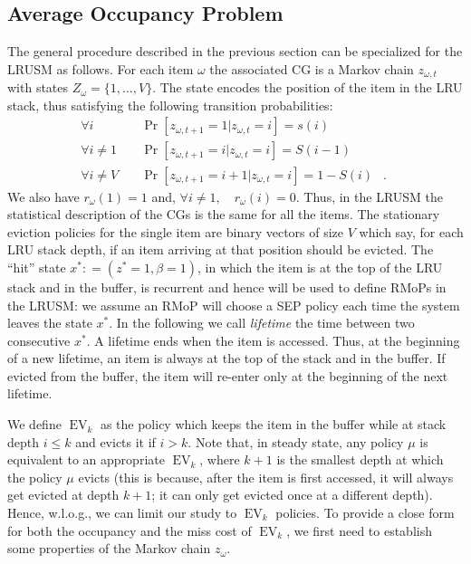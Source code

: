 \documentclass[11pt,a4paper]{article}
\DeclareMathOperator{\Pb}{Pr}
\DeclareMathOperator{\ev}{EV}
\DeclareMathOperator{\mf}{\enspace .}
\newcommand{\deq}{\mathrel{\mathop:}=}
\theoremstyle{definition}
\theoremstyle{remark}
\begin{document}
\subsection{Average Occupancy Problem}
\label{sec:aver-occup-probl}

The general procedure described in the previous section can be
specialized for the LRUSM as follows. For each item $\omega$ the
associated CG is a Markov chain $z_{\omega,t}$ with states
$Z_\omega=\{1, \ldots, V \}$. The state encodes the position of the
item in the LRU stack, thus satisfying the following transition
probabilities:
\begin{align}
  \forall i \quad &\Pb[z_{\omega,t+1}=1 | z_{\omega,t}=i]=s(i) \\
  \forall i \neq 1 \quad &\Pb[z_{\omega,t+1}=i | z_{\omega,t}=i]=S(i-1) \\
  \forall i \neq V \quad &\Pb[z_{\omega,t+1}=i+1 | z_{\omega,t}=i]=1-S(i) \mf
\end{align}
We also have $r_\omega(1)=1$ and, $\forall i \neq 1, \quad r_\omega(i)=0$.  Thus, in the
LRUSM the statistical description of the CGs is the same for all the items. The
stationary eviction policies for the single item are binary vectors of size $V$
which say, for each LRU stack depth, if an item arriving at that position should
be evicted.
The ``hit'' state $x^* \deq (z^* = 1,\beta=1)$, in which the item is
at the top of the LRU stack and in the buffer, is recurrent and hence
will be used to define RMoPs in the LRUSM: we assume an RMoP will
choose a SEP policy each time the system leaves the state $x^*$. In
the following we call \emph{lifetime} the time between two consecutive
$x^*$. A lifetime ends when the item is accessed. Thus, at the
beginning of a new lifetime, an item is always at the top of the stack
and in the buffer. If evicted from the buffer, the item will re-enter
only at the beginning of the next lifetime.

We define $\ev_k$ as the policy which keeps the item in the buffer while at
stack depth $i\leq k$ and evicts it if $i > k$. Note that, in steady state, any
policy $\mu$ is equivalent to an appropriate $\ev_k$, where $k+1$ is the
smallest depth at which the policy $\mu$ evicts (this is because, after the item
is first accessed, it will always get evicted at depth $k+1$; it can only get
evicted once at a different depth). Hence, w.l.o.g., we can limit our study to
$\ev_k$ policies.
To provide a close form for both the occupancy and the miss cost of
$\ev_k$, we first need to establish some properties of the Markov
chain $z_\omega$.
\end{document}
